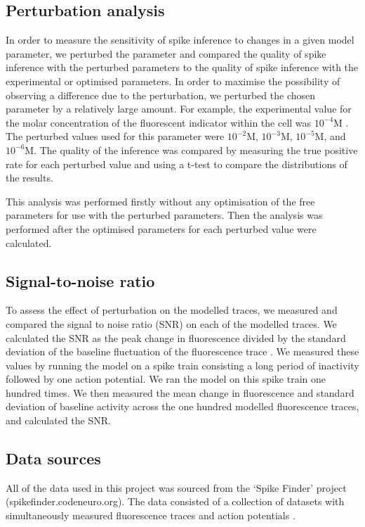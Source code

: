 \documentclass[a4paper,12pt]{article}
\theoremstyle{definition}
\begin{document}
\subsection{Perturbation analysis}
In order to measure the sensitivity of spike inference to changes in a given model parameter, we perturbed the parameter and compared the quality of spike inference with the perturbed parameters to the quality of spike inference with the experimental or optimised parameters. In order to maximise the possibility of observing a difference due to the perturbation, we perturbed the chosen parameter by a relatively large amount. For example, the experimental value for the molar concentration of the fluorescent indicator within the cell was $10^{−4}$M \cite{maravall}. The perturbed values used for this parameter were $10^{−2}$M, $10^{−3}$M, $10^{−5}$M, and $10^{−6}$M. The quality of the inference was compared by measuring the true positive rate for each perturbed value and using a t-test to compare the distributions of the results. 

This analysis was performed firstly without any optimisation of the free parameters for use with the perturbed parameters. Then the analysis was performed after the optimised parameters for each perturbed value were calculated.

\subsection{Signal-to-noise ratio}
To assess the effect of perturbation on the modelled traces, we measured and compared the signal to noise ratio (SNR) on each of the modelled traces. We calculated the SNR as the peak change in fluorescence divided by the standard deviation of the baseline fluctuation of the fluorescence trace \cite{tada}. We measured these values by running the model on a spike train consisting a long period of inactivity followed by one action potential. We ran the model on this spike train one hundred times. We then measured the mean change in fluorescence and standard deviation of baseline activity across the one hundred modelled fluorescence traces, and calculated the SNR.

\subsection{Data sources}
All of the data used in this project was sourced from the ‘Spike Finder’ project (spikefinder.codeneuro.org). The data consisted of a collection of datasets with simultaneously measured fluorescence traces and action potentials \cite{berens}.

\newpage


\end{document}
